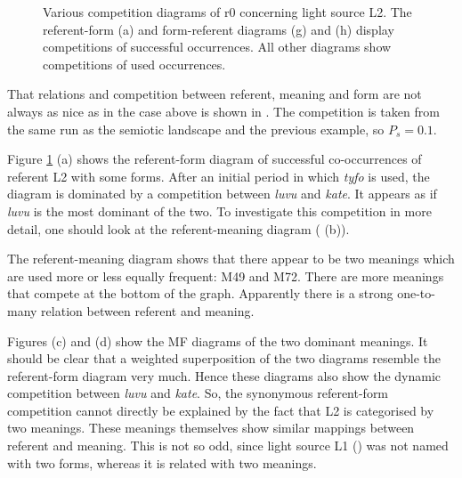 \begin{figure}
\centering
{}
\caption{Various competition diagrams of r0 concerning light source L2. The referent-form (a) and form-referent diagrams (g) and (h) display competitions of successful occurrences. All other diagrams show competitions of used occurrences.}
\label{f:opt:ggcomp2}
\end{figure}

That relations and competition between referent, meaning and form are not always as nice as in the case above is shown in . The competition is taken from the same run as the semiotic landscape and the previous example, so $P_s=0.1$.

Figure \ref{f:opt:ggcomp2} (a) shows the referent-form diagram of successful co-occurrences of referent L2 with some forms. After an initial period in which {\it tyfo} is used, the diagram is dominated by a competition between {\it luvu} and {\it kate}. It appears as if {\it luvu} is the most dominant of the two. To investigate this competition in more detail, one should look at the referent-meaning diagram ( (b)).

The referent-meaning diagram shows that there appear to be two meanings which are used more or less equally frequent: M49 and M72. There are more meanings that compete at the bottom of the graph. Apparently there is a strong one-to-many relation between referent and meaning. 

Figures (c) and (d) show the MF diagrams of the two dominant meanings. It should be clear that a weighted superposition of the two diagrams resemble the referent-form diagram very much. Hence these diagrams also show the dynamic competition between {\it luvu} and {\it kate}. So, the synonymous referent-form competition cannot directly be explained by the fact that L2 is categorised by two meanings. These meanings themselves show similar mappings between referent and meaning. This is not so odd, since light source L1 () was not named with two forms, whereas it is related with two meanings.

